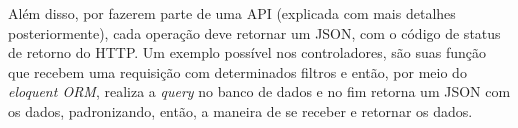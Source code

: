 Além disso, por fazerem parte de uma API (explicada com mais detalhes posteriormente), cada operação deve retornar um JSON, com o código de status de retorno do HTTP. Um exemplo possível nos controladores, são suas função que recebem uma requisição com determinados filtros e então, por meio do \textit{eloquent ORM}, realiza a \textit{query} no banco de dados e no fim retorna um JSON com os dados, padronizando, então, a maneira de se receber e retornar os dados.






